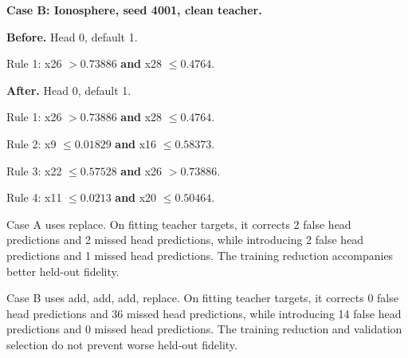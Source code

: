 \begin{kbtable}
\begin{minipage}[t]{0.48\linewidth}
\textbf{Case B: Ionosphere, seed 4001, clean teacher.}\par\smallskip
\textbf{Before.} Head 0, default 1.\par Rule 1: x26 \(> 0.73886\) \textbf{and} x28 \(\leq 0.4764\).\par\smallskip
\textbf{After.} Head 0, default 1.\par Rule 1: x26 \(> 0.73886\) \textbf{and} x28 \(\leq 0.4764\).\par Rule 2: x9 \(\leq 0.01829\) \textbf{and} x16 \(\leq 0.58373\).\par Rule 3: x22 \(\leq 0.57528\) \textbf{and} x26 \(> 0.73886\).\par Rule 4: x11 \(\leq 0.0213\) \textbf{and} x20 \(\leq 0.50464\).\par\smallskip
\end{minipage}
\end{kbtable}
Case A uses replace. On fitting teacher targets, it corrects 2 false head predictions and 2 missed head predictions, while introducing 2 false head predictions and 1 missed head predictions. The training reduction accompanies better held-out fidelity.

Case B uses add, add, add, replace. On fitting teacher targets, it corrects 0 false head predictions and 36 missed head predictions, while introducing 14 false head predictions and 0 missed head predictions. The training reduction and validation selection do not prevent worse held-out fidelity.

